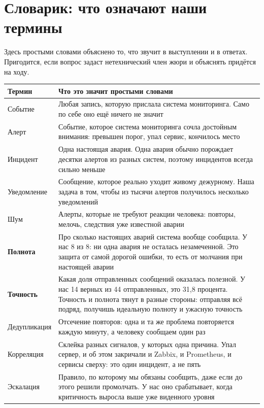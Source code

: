 \documentclass[11pt]{article}
\begin{document}
\section{Словарик: что означают наши термины}

Здесь простыми словами объяснено то, что звучит в выступлении и в ответах.
Пригодится, если вопрос задаст нетехнический член жюри и объяснять придётся
на ходу.

\begin{longtable}{|L{3.6cm}|L{12.9cm}|}
\hline
\textbf{Термин} & \textbf{Что это значит простыми словами} \\ \hline
Событие & Любая запись, которую прислала система мониторинга. Само по себе оно ещё ничего не значит \\ \hline
Алерт & Событие, которое система мониторинга сочла достойным внимания: превышен порог, упал сервис, кончилось место \\ \hline
Инцидент & Одна настоящая авария. Одна авария обычно порождает десятки алертов из разных систем, поэтому инцидентов всегда сильно меньше \\ \hline
Уведомление & Сообщение, которое реально уходит живому дежурному. Наша задача в том, чтобы из тысячи алертов получилось несколько уведомлений \\ \hline
Шум & Алерты, которые не требуют реакции человека: повторы, мелочь, следствия уже известной аварии \\ \hline
\textbf{Полнота} & Про сколько настоящих аварий система вообще сообщила. У нас 8 из 8: ни одна авария не осталась незамеченной. Это защита от самой дорогой ошибки, то есть от молчания при настоящей аварии \\ \hline
\textbf{Точность} & Какая доля отправленных сообщений оказалась полезной. У нас 14 верных из 44 отправленных, это 31,8 процента. Точность и полнота тянут в разные стороны: отправляя всё подряд, получишь идеальную полноту и ужасную точность \\ \hline
Дедупликация & Отсечение повторов: одна и та же проблема повторяется каждую минуту, а человеку сообщаем один раз \\ \hline
Корреляция & Склейка разных сигналов, у которых одна причина. Упал сервер, и об этом закричали и Zabbix, и Prometheus, и сервисы сверху: это один инцидент, а не пять \\ \hline
Эскалация & Правило, по которому мы обязаны сообщить, даже если до этого решили промолчать. У нас оно срабатывает, когда критичность выросла выше уже виденного уровня \\ \hline

\end{longtable}
\end{document}
